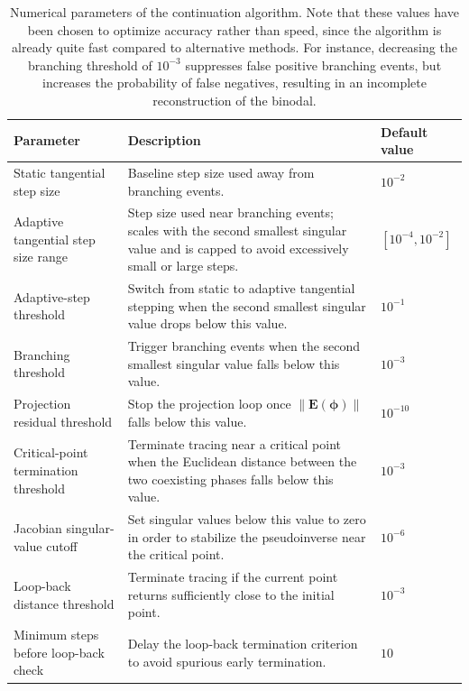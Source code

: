 \documentclass[12pt]{article}
\begin{document}
\begin{table}
\centering
\caption{Numerical parameters of the continuation algorithm. Note that these values have been chosen to optimize accuracy rather than speed, since the algorithm is already quite fast compared to alternative methods.
For instance, decreasing the branching threshold of $10^{-3}$ suppresses false positive branching events, but increases the probability of false negatives, resulting in an incomplete reconstruction of the binodal.
}
\label{tab:numerical_parameters}
\begin{numvaluesbox}
\centering
\renewcommand{\arraystretch}{1.15}
\begin{tabular}{|p{}|p{}|p{}|}
\hline
\textbf{Parameter} & \textbf{Description} & \textbf{Default value} \\
\hline
Static tangential step size & Baseline step size used away from branching events. & \(10^{-2}\) \\
\hline
Adaptive tangential step size range & Step size used near branching events; scales with the second smallest singular value and is capped to avoid excessively small or large steps. & \([10^{-4},10^{-2}]\) \\
\hline
Adaptive-step threshold & Switch from static to adaptive tangential stepping when the second smallest singular value drops below this value. & \(10^{-1}\) \\
\hline
Branching threshold & Trigger branching events when the second smallest singular value falls below this value. & \(10^{-3}\) \\
\hline
Projection residual threshold & Stop the projection loop once \(\|\boldsymbol{E}(\boldsymbol{\phi})\|\) falls below this value. & \(10^{-10}\) \\
\hline
Critical-point termination threshold & Terminate tracing near a critical point when the Euclidean distance between the two coexisting phases falls below this value. & \(10^{-3}\) \\
\hline
Jacobian singular-value cutoff & Set singular values below this value to zero in order to stabilize the pseudoinverse near the critical point. & \(10^{-6}\) \\
\hline
Loop-back distance threshold & Terminate tracing if the current point returns sufficiently close to the initial point. & \(10^{-3}\) \\
\hline
Minimum steps before loop-back check & Delay the loop-back termination criterion to avoid spurious early termination. & \(10\) \\
\hline
\end{tabular}
\end{numvaluesbox}
\end{table}
\end{document}
